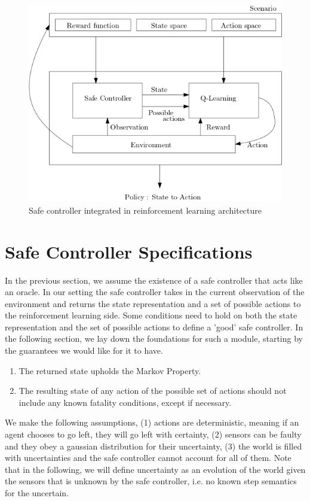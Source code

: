 \documentclass[a4paper,11pt]{article}
\begin{document}
\begin{figure}[H]
  \centering
  \includegraphics[scale=0.55]{rlsc.png}
  \caption{Safe controller integrated in reinforcement learning architecture}
  \label{fig:scinrl}
\end{figure}

\section{Safe Controller Specifications} \label{scspecs}
In the previous section, we assume the existence of a safe controller that acts like an oracle.
In our setting the safe controller takes in the current observation of the environment and 
returns the state representation and a set of possible actions to the reinforcement learning side. 
Some conditions need to hold on both the state representation and the set of possible actions to define a 'good' safe controller.
In the following section, we lay down the foundations 
for such a module, starting by the guarantees we would like for it to have. 

\begin{enumerate}
  \item The returned state upholds the Markov Property.
  \item The resulting state of any action of the possible set of actions 
        should not include any known fatality conditions, except if necessary. 
\end{enumerate}

We make the following assumptions, (1) actions are deterministic, meaning if an agent chooses to go left, they will go left with certainty, 
(2) sensors can be faulty and they obey a gaussian distribution for their uncertainty, (3) the world is filled with uncertainties and the safe controller cannot account 
for all of them. Note that in the following, we will define uncertainty as an evolution of the world given the sensors that is unknown by the safe controller, i.e.
no known step semantics for the uncertain.
\end{document}

